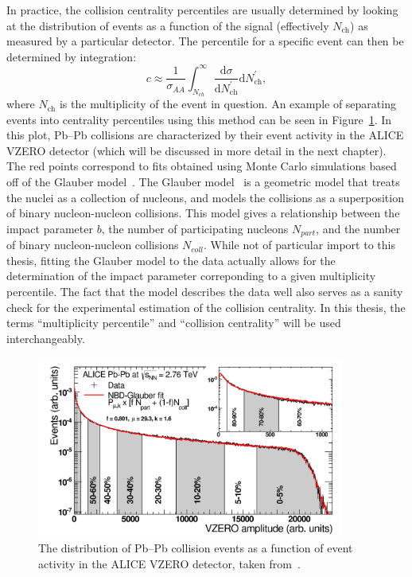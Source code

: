 In practice, the collision centrality percentiles are usually determined by looking at the distribution of events as a function of the signal (effectively $N_\text{ch}$) as measured by a particular detector. The percentile for a specific event can then be determined by integration:
%
\begin{equation}
    \label{eq:centrality_distribution}
    c \approx \frac{1}{\sigma_{A A}} \int_{N_{c h}}^{\infty} \frac{\mathrm{d} \sigma}{\mathrm{d} N_{\mathrm{ch}}^{\prime}} \mathrm{d} N_{\mathrm{ch}}^{\prime},
\end{equation}
%
where $N_\text{ch}$ is the multiplicity of the event in question. An example of separating events into centrality percentiles using this method can be seen in Figure~\ref{fig:alice_centrality}. In this plot, Pb--Pb collisions are characterized by their event activity in the ALICE VZERO detector (which will be discussed in more detail in the next chapter). The red points correspond to fits obtained using Monte Carlo simulations based off of the Glauber model~\cite{GlauberModelALICE1, GlauberModelALICE2}. The Glauber model~\cite{GlauberModel} is a geometric model that treats the nuclei as a collection of nucleons, and models the collisions as a superposition of binary nucleon-nucleon collisions. This model gives a relationship between the impact parameter $b$, the number of participating nucleons $N_{part}$, and the number of binary nucleon-nucleon collisions $N_{coll}$. While not of particular import to this thesis, fitting the Glauber model to the data actually allows for the determination of the impact parameter correponding to a given multiplicity percentile. The fact that the model describes the data well also serves as a sanity check for the experimental estimation of the collision centrality. In this thesis, the terms ``multiplicity percentile'' and ``collision centrality'' will be used interchangeably.

\begin{figure}[t!]
    \centering
    \includegraphics[width=0.9\textwidth]{figures/introduction/alice_centrality.png}
    \caption{The distribution of Pb--Pb collision events as a function of event activity in the ALICE VZERO detector, taken from~\cite{ALICECentrality}.}
    \label{fig:alice_centrality}
\end{figure}

